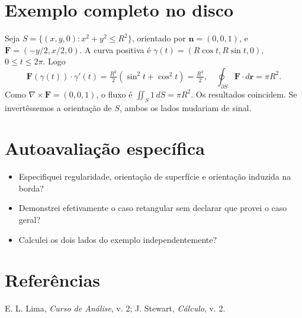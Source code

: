 \documentclass[11pt,a4paper]{article}
\begin{document}
\section{Exemplo completo no disco}
Seja $S=\{(x,y,0):x^2+y^2\le R^2\}$, orientado por $\mathbf n=(0,0,1)$, e $\mathbf F=(-y/2,x/2,0)$. A curva positiva é $\gamma(t)=(R\cos t,R\sin t,0)$, $0\le t\le2\pi$. Logo
\[
\mathbf F(\gamma(t))\cdot\gamma'(t)
=\tfrac{R^2}{2}(\sin^2t+\cos^2t)=\tfrac{R^2}{2},
\quad\oint_{\partial S}\mathbf F\cdot d\mathbf r=\pi R^2.
\]
Como $\nabla\times\mathbf F=(0,0,1)$, o fluxo é
$\iint_S 1\,dS=\pi R^2$. Os resultados coincidem. Se invertêssemos a orientação de $S$, ambos os lados mudariam de sinal.
\section{Autoavaliação específica}
\begin{itemize}
\item Especifiquei regularidade, orientação de superfície e orientação induzida na borda?
\item Demonstrei efetivamente o caso retangular sem declarar que provei o caso geral?
\item Calculei os dois lados do exemplo independentemente?
\end{itemize}
\RubricaUFMT
\section{Referências}
E. L. Lima, \emph{Curso de Análise}, v. 2; J. Stewart, \emph{Cálculo}, v. 2.
\end{document}
